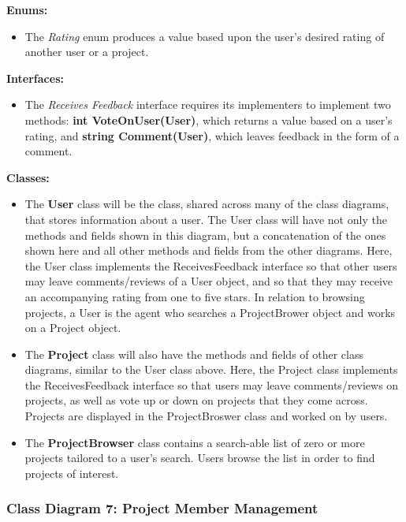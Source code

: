 \documentclass[twoside,letterpaper]{article}
\begin{document}
{\textbf{Enums:}\\
\begin{itemize}
	\item The \textit{Rating} enum produces a value based upon the user's desired rating of another user or a project.
\end{itemize}
\textbf{Interfaces:}\\
\begin{itemize}
	\item The \textit{Receives Feedback} interface requires its implementers to implement two methods: \textbf{int VoteOnUser(User)}, which returns a value based on a user's rating, and \textbf{string Comment(User)}, which leaves feedback in the form of a comment.
\end{itemize}
\textbf{Classes:}
\begin{itemize}
	\item The \textbf{User} class will be the class, shared across many of the class diagrams, that stores information about a user. The User class will have not only the methods and fields shown in this diagram, but a concatenation of the ones shown here and all other methods and fields from the other diagrams. Here, the User class implements the ReceivesFeedback interface so that other users may leave comments/reviews of a User object, and so that they may receive an accompanying rating from one to five stars. In relation to browsing projects, a User is the agent who searches a ProjectBrower object and works on a Project object.
	\item The \textbf{Project} class will also have the methods and fields of other class diagrams, similar to the User class above. Here, the Project class implements the ReceivesFeedback interface so that users may leave comments/reviews on projects, as well as vote up or down on projects that they come across. Projects are displayed in the ProjectBroswer class and worked on by users.
	\item The \textbf{ProjectBrowser} class contains a search-able list of zero or more projects tailored to a user's search. Users browse the list in order to find projects of interest. 
\end{itemize}

\newpage
\subsubsection[Class Diagram 7: Project Member Management]{\rmfamily\bfseries\color{black}
	Class Diagram 7: Project Member Management}
\hypertarget{RefHeading22059017292}{}
\bigskip

}
\end{document}
